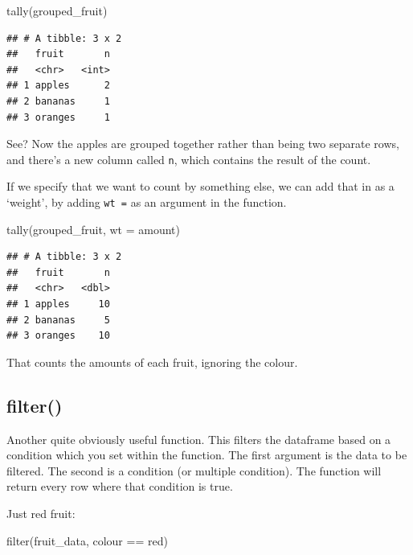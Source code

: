 \documentclass[
]{book}
\newenvironment{Shaded}{\begin{snugshade}}{\end{snugshade}}
\newcommand{\AttributeTok}[1]{\textcolor[rgb]{0.77,0.63,0.00}{#1}}
\newcommand{\FunctionTok}[1]{\textcolor[rgb]{0.00,0.00,0.00}{#1}}
\newcommand{\NormalTok}[1]{#1}
\newcommand{\SpecialCharTok}[1]{\textcolor[rgb]{0.00,0.00,0.00}{#1}}
\newcommand{\StringTok}[1]{\textcolor[rgb]{0.31,0.60,0.02}{#1}}
\begin{document}
\begin{Shaded}
\begin{Highlighting}[]
\FunctionTok{tally}\NormalTok{(grouped\_fruit)}
\end{Highlighting}
\end{Shaded}

\begin{verbatim}
## # A tibble: 3 x 2
##   fruit       n
##   <chr>   <int>
## 1 apples      2
## 2 bananas     1
## 3 oranges     1
\end{verbatim}

See? Now the apples are grouped together rather than being two separate rows, and there's a new column called \texttt{n}, which contains the result of the count.

If we specify that we want to count by something else, we can add that in as a `weight', by adding \texttt{wt\ =} as an argument in the function.

\begin{Shaded}
\begin{Highlighting}[]
\FunctionTok{tally}\NormalTok{(grouped\_fruit, }\AttributeTok{wt =}\NormalTok{ amount)}
\end{Highlighting}
\end{Shaded}

\begin{verbatim}
## # A tibble: 3 x 2
##   fruit       n
##   <chr>   <dbl>
## 1 apples     10
## 2 bananas     5
## 3 oranges    10
\end{verbatim}

That counts the amounts of each fruit, ignoring the colour.

\hypertarget{filter}{%
\subsection{filter()}\label{filter}}

Another quite obviously useful function. This filters the dataframe based on a condition which you set within the function. The first argument is the data to be filtered. The second is a condition (or multiple condition). The function will return every row where that condition is true.

Just red fruit:

\begin{Shaded}
\begin{Highlighting}[]
\FunctionTok{filter}\NormalTok{(fruit\_data, colour }\SpecialCharTok{==} \StringTok{\textquotesingle{}red\textquotesingle{}}\NormalTok{)}
\end{Highlighting}
\end{Shaded}
\end{document}
